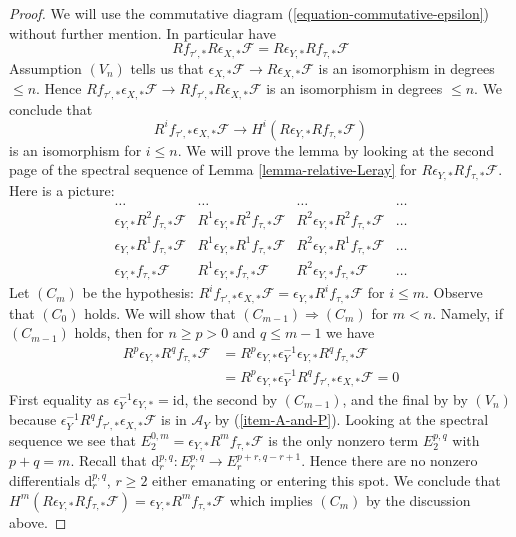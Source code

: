 \begin{proof}
We will use the commutative diagram (\ref{equation-commutative-epsilon})
without further mention. In particular have
$$
Rf_{\tau', *}R\epsilon_{X, *}\mathcal{F} =
R\epsilon_{Y, *}Rf_{\tau, *}\mathcal{F}
$$
Assumption $(V_n)$ tells us that
$\epsilon_{X, *}\mathcal{F} \to R\epsilon_{X, *}\mathcal{F}$
is an isomorphism in degrees $\leq n$. Hence
$Rf_{\tau', *}\epsilon_{X, *}\mathcal{F} \to
Rf_{\tau', *}R\epsilon_{X, *}\mathcal{F}$ is an isomorphism
in degrees $\leq n$. We conclude that
$$
R^if_{\tau', *}\epsilon_{X, *}\mathcal{F} \to
H^i(R\epsilon_{Y, *}Rf_{\tau, *}\mathcal{F})
$$
is an isomorphism for $i \leq n$. We will prove the lemma by looking
at the second page of the spectral sequence of
Lemma \ref{lemma-relative-Leray}
for $R\epsilon_{Y, *}Rf_{\tau, *}\mathcal{F}$. Here is a picture:
$$
\begin{matrix}
\ldots &
\ldots &
\ldots &
\ldots \\
\epsilon_{Y, *}R^2f_{\tau, *}\mathcal{F} &
R^1\epsilon_{Y, *}R^2f_{\tau, *}\mathcal{F} &
R^2\epsilon_{Y, *}R^2f_{\tau, *}\mathcal{F} &
\ldots \\
\epsilon_{Y, *}R^1f_{\tau, *}\mathcal{F} &
R^1\epsilon_{Y, *}R^1f_{\tau, *}\mathcal{F} &
R^2\epsilon_{Y, *}R^1f_{\tau, *}\mathcal{F} &
\ldots \\
\epsilon_{Y, *}f_{\tau, *}\mathcal{F} &
R^1\epsilon_{Y, *}f_{\tau, *}\mathcal{F} &
R^2\epsilon_{Y, *}f_{\tau, *}\mathcal{F} &
\ldots
\end{matrix}
$$
Let $(C_m)$ be the hypothesis:  $R^if_{\tau', *}\epsilon_{X, *}\mathcal{F} =
\epsilon_{Y, *}R^if_{\tau, *}\mathcal{F}$ for $i \leq m$. Observe that
$(C_0)$ holds. We will show that $(C_{m - 1}) \Rightarrow (C_m)$ for $m < n$.
Namely, if $(C_{m - 1})$ holds, then for
$n \geq p > 0$ and $q \leq m - 1$ we have
\begin{align*}
R^p\epsilon_{Y, *}R^qf_{\tau, *}\mathcal{F}
& =
R^p\epsilon_{Y, *}
\epsilon_Y^{-1} \epsilon_{Y, *} R^qf_{\tau, *}\mathcal{F} \\
& =
R^p\epsilon_{Y, *}
\epsilon_Y^{-1}R^qf_{\tau', *}\epsilon_{X, *}\mathcal{F} = 0
\end{align*}
First equality as $\epsilon_Y^{-1}\epsilon_{Y, *} = \text{id}$,
the second by $(C_{m - 1})$, and the final by
by $(V_n)$ because $\epsilon_Y^{-1}R^qf_{\tau', *}\epsilon_{X, *}\mathcal{F}$
is in $\mathcal{A}_Y$ by (\ref{item-A-and-P}).
Looking at the spectral sequence we see that
$E_2^{0, m} = \epsilon_{Y, *}R^mf_{\tau, *}\mathcal{F}$
is the only nonzero term $E_2^{p, q}$ with $p + q = m$.
Recall that $\text{d}_r^{p, q} : E_r^{p, q} \to E_r^{p + r, q - r + 1}$.
Hence there are no nonzero differentials $\text{d}_r^{p, q}$, $r \geq 2$
either emanating or entering this spot. We conclude that
$H^m(R\epsilon_{Y, *}Rf_{\tau, *}\mathcal{F}) =
\epsilon_{Y, *}R^mf_{\tau, *}\mathcal{F}$ which implies
$(C_m)$ by the discussion above.


\end{proof}
